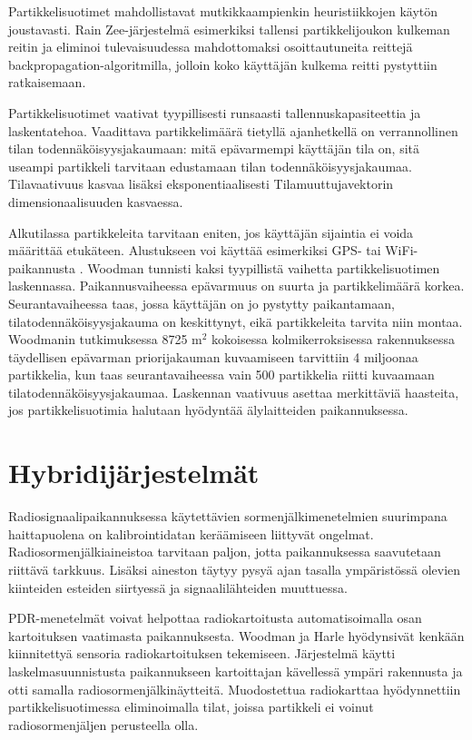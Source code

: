 Partikkelisuotimet mahdollistavat mutkikkaampienkin heuristiikkojen käytön
joustavasti. Rain \cite{rai2012} Zee-järjestelmä esimerkiksi tallensi
partikkelijoukon kulkeman reitin ja eliminoi tulevaisuudessa mahdottomaksi
osoittautuneita reittejä backpropagation-algoritmilla, jolloin koko käyttäjän
kulkema reitti pystyttiin ratkaisemaan.

Partikkelisuotimet vaativat tyypillisesti runsaasti tallennuskapasiteettia ja
laskentatehoa. Vaadittava partikkelimäärä tietyllä ajanhetkellä on
verrannollinen tilan todennäköisyysjakaumaan: mitä epävarmempi käyttäjän tila
on, sitä useampi partikkeli tarvitaan edustamaan tilan todennäköisyysjakaumaa.
Tilavaativuus kasvaa lisäksi eksponentiaalisesti Tilamuuttujavektorin
dimensionaalisuuden kasvaessa.

Alkutilassa partikkeleita tarvitaan eniten, jos käyttäjän sijaintia ei voida
määrittää etukäteen. Alustukseen voi käyttää esimerkiksi GPS- tai
WiFi-paikannusta \cite{woodman2009}. Woodman \cite{woodman2010} tunnisti kaksi
tyypillistä vaihetta partikkelisuotimen laskennassa. Paikannusvaiheessa
epävarmuus on suurta ja partikkelimäärä korkea. Seurantavaiheessa taas, jossa
käyttäjän on jo pystytty paikantamaan, tilatodennäköisyysjakauma on
keskittynyt, eikä partikkeleita tarvita niin montaa. Woodmanin tutkimuksessa
8725 $\text{m}^2$ kokoisessa kolmikerroksisessa rakennuksessa täydellisen
epävarman priorijakauman kuvaamiseen tarvittiin 4 miljoonaa partikkelia, kun
taas seurantavaiheessa vain 500 partikkelia riitti kuvaamaan
tilatodennäköisyysjakaumaa. Laskennan vaativuus asettaa merkittäviä haasteita,
jos partikkelisuotimia halutaan hyödyntää älylaitteiden paikannuksessa.

\section{Hybridijärjestelmät}

Radiosignaalipaikannuksessa käytettävien sormenjälkimenetelmien suurimpana
haittapuolena on kalibrointidatan keräämiseen liittyvät ongelmat.
Radiosormenjälkiaineistoa tarvitaan paljon, jotta paikannuksessa saavutetaan
riittävä tarkkuus.  Lisäksi aineston täytyy pysyä ajan tasalla ympäristössä
olevien kiinteiden esteiden siirtyessä ja signaalilähteiden muuttuessa.

PDR-menetelmät voivat helpottaa radiokartoitusta automatisoimalla osan
kartoituksen vaatimasta paikannuksesta. Woodman ja Harle \cite{woodman2008}
hyödynsivät kenkään kiinnitettyä sensoria radiokartoituksen tekemiseen.
Järjestelmä käytti laskelmasuunnistusta paikannukseen kartoittajan kävellessä
ympäri rakennusta ja otti samalla radiosormenjälkinäytteitä.  Muodostettua
radiokarttaa hyödynnettiin partikkelisuotimessa eliminoimalla tilat, joissa
partikkeli ei voinut radiosormenjäljen perusteella olla.

